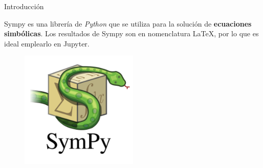 \begin{frame}[t]{Introducci\'on}\vspace{10pt}

Sympy es una librer\'ia de \textit{Python} que se utiliza para la soluci\'on de \textbf{ecuaciones simb\'olicas}. Los resultados de Sympy son en nomenclatura \LaTeX, por lo que es ideal emplearlo en Jupyter.

\begin{figure}
\centering
\includegraphics[width=0.5\textwidth]{Images/logo.png}
\end{figure}

\end{frame}